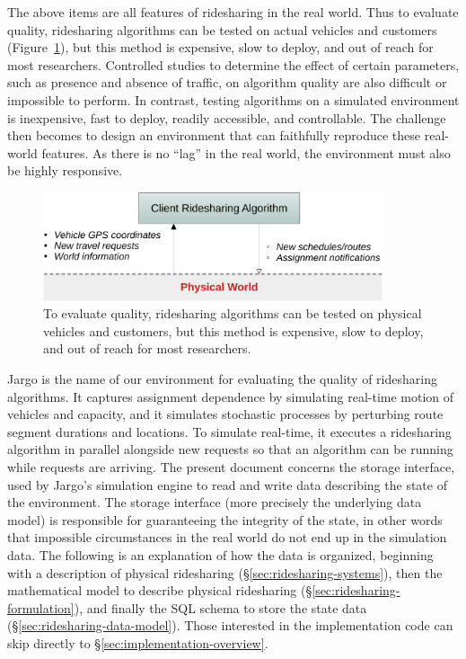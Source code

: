 \documentclass{article}
\theoremstyle{definition}                   %
\begin{document}
The above items are all features of ridesharing in the real world.  Thus to
evaluate quality, ridesharing algorithms can be tested on actual vehicles and
customers (Figure~\ref{fig:physical}), but this method is expensive, slow to
deploy, and out of reach for most researchers. Controlled studies to determine
the effect of certain parameters, such as presence and absence of traffic, on
algorithm quality are also difficult or impossible to perform. In contrast,
testing algorithms on a simulated environment is inexpensive, fast to deploy,
readily accessible, and controllable. The challenge then becomes to design an
environment that can faithfully reproduce these real-world features. As there
is no ``lag'' in the real world, the environment must also be highly
responsive.

\begin{figure}[h]
\centering
\includegraphics[width=100mm]{src/fig/physical}
\caption{To evaluate quality, ridesharing algorithms can be tested on physical
vehicles and customers, but this method is expensive, slow to deploy, and out
of reach for most researchers.}
\label{fig:physical}
\end{figure}

Jargo is the name of our environment for evaluating the quality of ridesharing
algorithms. It captures assignment dependence by simulating real-time motion of
vehicles and capacity, and it simulates stochastic processes by perturbing
route segment durations and locations. To simulate real-time, it executes a
ridesharing algorithm in parallel alongside new requests so that an algorithm
can be running while requests are arriving. The present document concerns the
storage interface, used by Jargo's simulation engine to read and write data
describing the state of the environment. The storage interface (more precisely
the underlying data model) is responsible for guaranteeing the integrity of the
state, in other words that impossible circumstances in the real world do not
end up in the simulation data. The following is an explanation of how the data
is organized, beginning with a description of physical ridesharing
(\S\ref{sec:ridesharing-systems}), then the mathematical model to describe
physical ridesharing (\S\ref{sec:ridesharing-formulation}), and finally the SQL
schema to store the state data (\S\ref{sec:ridesharing-data-model}).  Those
interested in the implementation code can skip directly to
\S\ref{sec:implementation-overview}.
\end{document}
